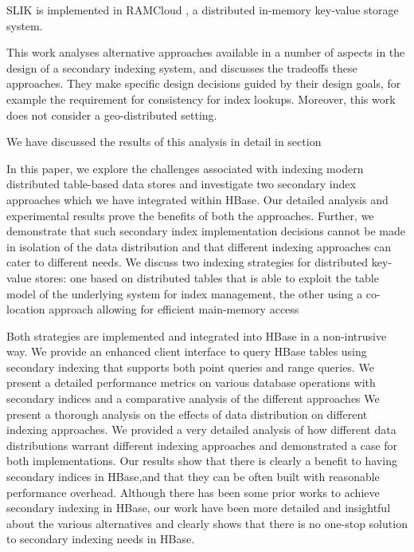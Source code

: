 SLIK is implemented in RAMCloud \cite{ousterhout:ramcloud}, a distributed in-memory key-value storage system.

This work analyses alternative approaches available in a number of aspects in the design of a secondary indexing system, and discusses the tradeoffs these approaches.
They make specific design decisions guided by their design goals, for example the requirement for consistency for index lookups.
Moreover, this work does not consider a geo-distributed setting.


\cite{dsilva:tworings}
We have discussed the results of this analysis in detail in section

In this paper, we explore the challenges associated with indexing modern distributed table-based data stores and investigate two secondary index approaches which we have integrated within HBase.
Our detailed analysis and experimental results prove the benefits of both the approaches.
Further, we demonstrate that such secondary index implementation decisions cannot be made in isolation of the data distribution and that different indexing approaches can cater to different needs.
We discuss two indexing strategies for distributed key-value stores:
one based on distributed tables that is able to exploit the table model of the underlying system for index management,
the other using a co-location approach allowing for efficient main-memory access

Both strategies are implemented and integrated into HBase in a non-intrusive way.
We provide an enhanced client interface to query HBase tables using secondary indexing that supports both point queries and range queries.
We present a detailed performance metrics on various database operations with secondary indices and a comparative analysis of the different approaches
We present a thorough analysis on the effects of data distribution on different indexing approaches.
We provided a very detailed analysis of how different data distributions warrant different indexing approaches and demonstrated a case for both implementations.
Our results show that there is clearly a benefit to  having  secondary  indices  in  HBase,and  that  they  can  be  often  built  with  reasonable  performance overhead.
Although there has been some prior works to achieve secondary indexing in HBase,
our work have been more detailed and insightful about the various alternatives and clearly shows that there is no one-stop solution to secondary indexing needs in HBase.



